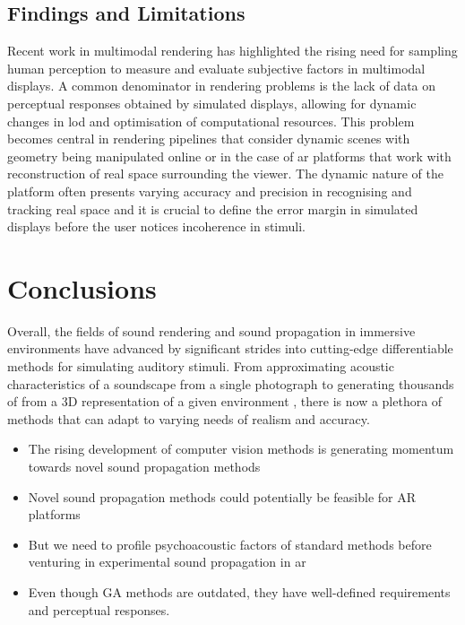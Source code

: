 \subsection{Findings and Limitations}
Recent work in multimodal rendering has highlighted the rising need for sampling human perception to measure and evaluate subjective factors in multimodal displays. A common denominator in rendering problems is the lack of data on perceptual responses obtained by simulated displays, allowing for dynamic changes in \acrshort{lod} and optimisation of computational resources. This problem becomes central in rendering pipelines that consider dynamic scenes with geometry being manipulated online or in the case of \acrshort{ar} platforms that work with reconstruction of real space surrounding the viewer. The dynamic nature of the platform often presents varying accuracy and precision in recognising and tracking real space and it is crucial to define the error margin in simulated displays before the user notices incoherence in stimuli.

\section{Conclusions}
Overall, the fields of sound rendering and sound propagation in immersive environments have advanced by significant strides into cutting-edge differentiable methods for simulating auditory stimuli. From approximating acoustic characteristics of a soundscape from a single photograph \citep{Singh_2021_ICCV} to generating thousands of  from a 3D representation of a given environment \citep{ratnarajah2022mesh2ir}, there is now a plethora of methods that can adapt to varying needs of realism and accuracy.

\begin{itemize}
    \item The rising development of computer vision methods is generating momentum towards novel sound propagation methods
    \item Novel sound propagation methods could potentially be feasible for AR platforms
    \item But we need to profile psychoacoustic factors of standard methods before venturing in experimental sound propagation in ar
    \item Even though GA methods are outdated, they have well-defined requirements and perceptual responses.
 
\end{itemize}

